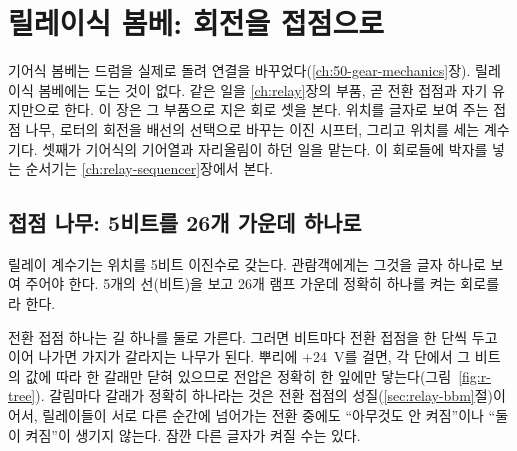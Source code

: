 \chapter{릴레이식 봄베: 회전을 접점으로}\label{ch:relay-machine}

기어식 봄베는 드럼을 실제로 돌려 연결을 바꾸었다(\ref{ch:50-gear-mechanics}장). 릴레이식 봄베에는 도는 것이 없다.
같은 일을 \ref{ch:relay}장의 부품, 곧 전환 접점과 자기 유지만으로 한다. 이 장은 그 부품으로 지은 회로 셋을 본다.
위치를 글자로 보여 주는 접점 나무, 로터의 회전을 배선의 선택으로 바꾸는 이진 시프터, 그리고 위치를 세는 계수기다.
셋째가 기어식의 기어열과 자리올림이 하던 일을 맡는다. 이 회로들에 박자를 넣는 순서기는 \ref{ch:relay-sequencer}장에서 본다.

\section{접점 나무: 5비트를 26개 가운데 하나로}\label{sec:relay-tree}

릴레이 계수기는 위치를 5비트 이진수로 갖는다. 관람객에게는 그것을 글자 하나로 보여 주어야 한다. 5개의
선(비트)을 보고 26개 램프 가운데 정확히 하나를 켜는 회로를 라 한다.

\Why 전환 접점 하나는 길 하나를 둘로 가른다. 그러면 비트마다 전환 접점을 한 단씩 두고 이어 나가면
가지가 갈라지는 나무가 된다. 뿌리에 +24~V를 걸면, 각 단에서 그 비트의 값에 따라 한 갈래만 닫혀 있으므로
전압은 정확히 한 잎에만 닿는다(그림~\ref{fig:r-tree}). 갈림마다 갈래가 정확히 하나라는 것은 전환 접점의
성질(\ref{sec:relay-bbm}절)이어서, 릴레이들이 서로 다른 순간에 넘어가는 전환 중에도 ``아무것도 안 켜짐''이나
``둘이 켜짐''이 생기지 않는다. 잠깐 다른 글자가 켜질 수는 있다.

